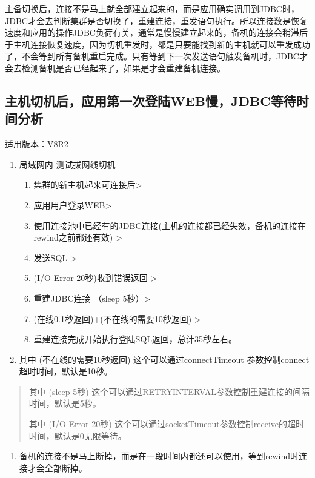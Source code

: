 \documentclass[letterpaper,10pt,english]{sphinxmanual}
\begin{document}
主备切换后，连接不是马上就全部建立起来的，而是应用确实调用到JDBC时，JDBC才会去判断集群是否切换了，重建连接，重发语句执行。所以连接数是恢复速度和应用的操作JDBC负荷有关，通常是慢慢建立起来的，备机的连接会稍滞后于主机连接恢复速度，因为切机重发时，都是只要能找到新的主机就可以重发成功了，不会等到所有备机重启完成。只有等到下一次发送语句触发备机时，JDBC才会去检测备机是否已经起来了，如果是才会重建备机连接。


\subsection{主机切机后，应用第一次登陆WEB慢，JDBC等待时间分析}
\label{\detokenize{interface/jdbc:web-jdbc}}
适用版本：V8R2
\begin{enumerate}
%
\item {} 
局域网内 测试拔网线切机
\begin{enumerate}
%
\item {} 
集群的新主机起来可连接后\sphinxhyphen{}>

\item {} 
应用用户登录WEB\sphinxhyphen{}>

\item {} 
使用连接池中已经有的JDBC连接(主机的连接都已经失效，备机的连接在rewind之前都还有效) \sphinxhyphen{}>

\item {} 
发送SQL \sphinxhyphen{}>

\item {} 
(I/O Error 20秒)收到错误返回 \sphinxhyphen{}>

\item {} 
重建JDBC连接 （sleep 5秒）\sphinxhyphen{}>

\item {} 
(在线0.1秒返回)+(不在线的需要10秒返回) \sphinxhyphen{}>

\item {} 
重建连接完成开始执行登陆SQL返回，总计35秒左右。

\end{enumerate}

\item {} 
其中 (不在线的需要10秒返回) 这个可以通过connectTimeout 参数控制connect超时时间，默认是10秒。

\end{enumerate}
\begin{quote}

其中 (sleep 5秒) 这个可以通过RETRYINTERVAL参数控制重建连接的间隔时间，默认是5秒。

其中 (I/O Error 20秒) 这个可以通过socketTimeout参数控制receive的超时时间，默认是0无限等待。
\end{quote}
\begin{enumerate}
%
\setcounter{enumi}{2}
\item {} 
备机的连接不是马上断掉，而是在一段时间内都还可以使用，等到rewind时连接才会全部断掉。

\end{enumerate}
\end{document}
